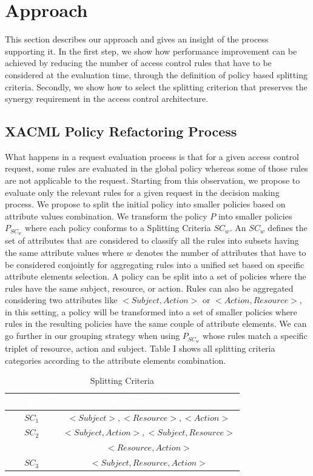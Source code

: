 \section{Approach} \label{sec:approach}
This section describes our approach and gives an insight of the process supporting it. In the first step, we show how performance improvement can be achieved by
reducing the number of access control rules that have to be considered at the evaluation time, through the definition of policy based splitting criteria. 
Secondly, we show how to select the splitting criterion that preserves the synergy requirement in the access control architecture.

\subsection{XACML Policy Refactoring Process}
What happens in a request evaluation process is that for a given access control request, some rules are evaluated in the global policy whereas some of those rules are not
 applicable to the request. Starting from this observation, we propose to evaluate only the relevant rules for a given request in the decision making process. 
We propose to split the initial policy into smaller policies based on attribute values combination. We transform the policy \normalsize $P$ into smaller 
policies \normalsize $P_{SC_{w}}$ where each policy conforms to a Splitting Criteria $SC_{w}$. An $SC_{w}$ defines the set of attributes that are considered 
to classify all the rules into subsets having the same attribute values where $w$ denotes the number of attributes that have to be considered conjointly for aggregating 
rules into a unified set based on specific attribute elements selection. A policy can be split into a set of policies where the rules have the same subject, resource, or action. 
Rules can also be aggregated considering two attributes like $<Subject, Action>$ or $<Action, Resource>$, in this setting, a policy will be transformed into a set of smaller 
policies where rules in the resulting policies have the same couple of attribute elements. We can go further in our grouping strategy when using $P_{SC_{w}}$ whose 
rules match a specific triplet of resource, action and subject. Table I shows all splitting criteria categories according to the attribute elements combination.
\begin{table}[h!]
\centering
\setlength{\extrarowheight}{6 pt}
\begin{tabular}{|>{\small}c|>{\small}c|} 
\hline  \rowcolor{black} 
 \bf
\textcolor{white}{Categories}& \bf \textcolor{white}{Splitting Criteria}\\ \hline
 $SC_{1}$& {$<Subject>, <Resource>, <Action>$}\\ \hline

$SC_{2}$& {$<Subject,Action>, <Subject,Resource>$}\\&{$<Resource,Action>$}\\  \hline

$SC_{3}$& {$<Subject,Resource,Action>$}\\ \hline
\end{tabular}
\caption{Splitting Criteria}
\label{table1}\end{table}

